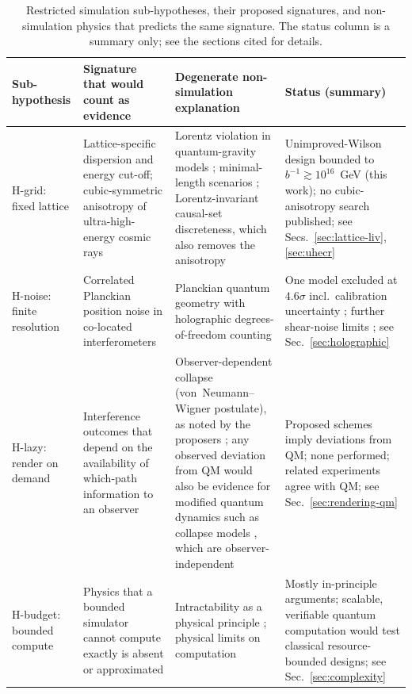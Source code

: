 \begin{table}[t]
\centering
\footnotesize
\caption{Restricted simulation sub-hypotheses, their proposed signatures, and
non-simulation physics that predicts the same signature. The status column is
a summary only; see the sections cited for details.}
\label{tab:subhyp}
\begin{tabular}{p{}p{}p{}p{}}
\hline
Sub-hypothesis & Signature that would count as evidence & Degenerate non-simulation explanation & Status (summary) \\
\hline
H-grid: fixed lattice & Lattice-specific dispersion and energy cut-off; cubic-symmetric anisotropy of ultra-high-energy cosmic rays \cite{Beane2014constraints} & Lorentz violation in quantum-gravity models \cite{Mattingly2005modern}; minimal-length scenarios \cite{Hossenfelder2013minimal}; Lorentz-invariant causal-set discreteness, which also removes the anisotropy \cite{Dowker2004quantum} & Unimproved-Wilson design bounded to $b^{-1}\gtrsim10^{16}$~GeV (this work); no cubic-anisotropy search published; see Secs.~\ref{sec:lattice-liv}, \ref{sec:uhecr} \\
H-noise: finite resolution & Correlated Planckian position noise in co-located interferometers & Planckian quantum geometry with holographic degrees-of-freedom counting \cite{Hogan2012interferometers} & One model excluded at $4.6\sigma$ incl.\ calibration uncertainty \cite{Chou2016first}; further shear-noise limits \cite{Chou2017interferometric}; see Sec.~\ref{sec:holographic} \\
H-lazy: render on demand & Interference outcomes that depend on the availability of which-path information to an observer \cite{Campbell2017on} & Observer-dependent collapse (von~Neumann--Wigner postulate), as noted by the proposers \cite{Campbell2017on}; any observed deviation from QM would also be evidence for modified quantum dynamics such as collapse models \cite{Bassi2013models}, which are observer-independent & Proposed schemes imply deviations from QM; none performed; related experiments agree with QM; see Sec.~\ref{sec:rendering-qm} \\
H-budget: bounded compute & Physics that a bounded simulator cannot compute exactly is absent or approximated & Intractability as a physical principle \cite{Aaronson2005np}; physical limits on computation \cite{Lloyd2002computational} & Mostly in-principle arguments; scalable, verifiable quantum computation would test classical resource-bounded designs; see Sec.~\ref{sec:complexity} \\

\end{tabular}
\end{table}
